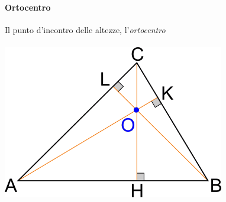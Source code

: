\documentclass[12pt, a4paper,oneside]{report}
\begin{document}
	\paragraph{Ortocentro}
	Il punto d'incontro delle altezze, l'\textit{ortocentro}\\
	\\
	\includegraphics{Ort.jpg}
\end{document}
